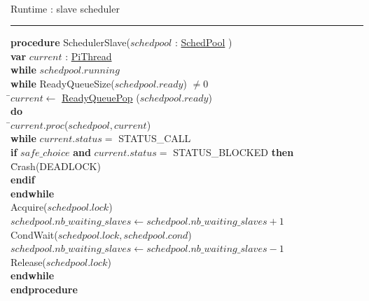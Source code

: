 \documentclass[a4paper,11pt]{article}
\newenvironment{program}{
  \begin{sffamily}
  \begin{scriptsize}
  \begin{tabbing}}
 {\end{tabbing}
  \end{scriptsize}
  \end{sffamily}}
\newcommand{\kw}[1]{\textsf{\textbf{#1}}}
\newcommand{\pindent}{\hspace{2em}\=}
\newcommand{\synchro}[1]{\textcolor{synchrocolor}{#1}}
\newcommand{\algotitle}[1]{\noindent\\ \noindent#1\par\nobreak\vspace{3pt}\hrule\vspace{6pt}}
\newcommand{\algosection}[1]{
  \phantomsection
  \algotitle{#1}
}
\newcommand{\myref}[1]{
  \hyperref[#1]{#1}
}
\begin{document}
\label{SchedulerSlave}
\algosection{Runtime : slave scheduler}
\begin{program}
  \kw{procedure} SchedulerSlave($schedpool$ : \myref{SchedPool}) \\
  \pindent\kw{var} $current$ : \myref{PiThread} \\
  \>\kw{while} $schedpool.running$ \\
  \>\pindent\kw{while} ReadyQueueSize($schedpool.ready$) $\neq 0$ \\
  \>\>\pindent$current \leftarrow$ \synchro{\myref{ReadyQueuePop}($schedpool.ready$)} \\
  \>\>\>\kw{do} \\
  \>\>\>\pindent$current.proc$($schedpool, current$) \\
  \>\>\>\kw{while} $current.status =$ STATUS\_CALL \\
  \>\>\>\kw{if} $safe\_choice$ \kw{and} $current.status =$ STATUS\_BLOCKED \kw{then} \\
  \>\>\>\pindent Crash(DEADLOCK) \\
  \>\>\>\kw{endif} \\
  \>\>\kw{endwhile} \\
  \>\>\synchro{Acquire($schedpool.lock$)} \\
  \>\>$schedpool.nb\_waiting\_slaves \leftarrow schedpool.nb\_waiting\_slaves + 1$ \\
  \>\>\synchro{CondWait($schedpool.lock, schedpool.cond$)} \\
  \>\>$schedpool.nb\_waiting\_slaves \leftarrow schedpool.nb\_waiting\_slaves - 1$ \\
  \>\>\synchro{Release($schedpool.lock$)} \\
  \>\kw{endwhile} \\
  \kw{endprocedure}
\end{program}
\end{document}
